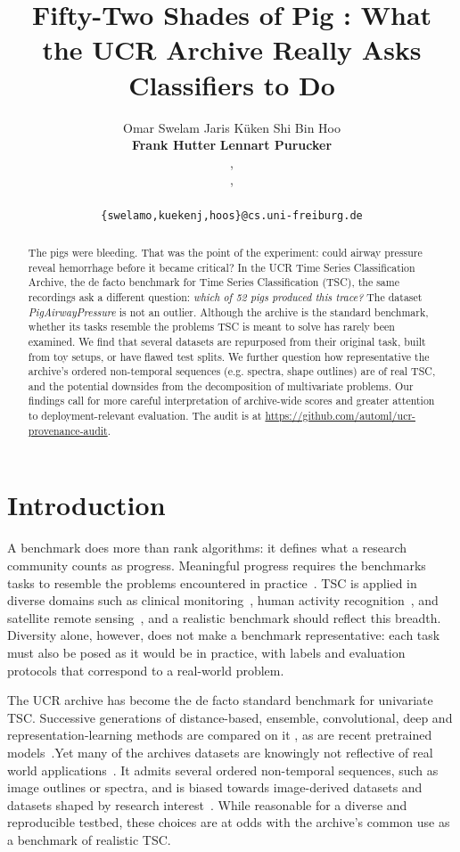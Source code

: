 \documentclass{article}
\title{Fifty-Two Shades of Pig \pig: What the UCR Archive Really Asks Classifiers to Do}
\author{
Omar Swelam \ufrc\equal \quad Jaris Küken \ufrc\equal \quad Shi Bin Hoo \ufrc\equal\\ \textbf{Frank Hutter} \priorc\ellisc\ufr \quad \textbf{Lennart Purucker}\priorc\ufr \\ 
\ufrtext, \\ \priortext, \ellistext \\
\equaltext \\
\texttt{\{swelamo,kuekenj,hoos\}@cs.uni-freiburg.de}
}
\begin{document}
\maketitle

\begin{abstract}
The pigs were bleeding. That was the point of the experiment: could airway pressure reveal hemorrhage before it became critical? In the UCR Time Series Classification Archive, the de facto benchmark for Time Series Classification (TSC), the same recordings ask a different question: \emph{which of 52 pigs produced this trace?} The dataset \emph{PigAirwayPressure} is not an outlier. Although the archive is the standard benchmark, whether its tasks resemble the problems TSC is meant to solve has rarely been examined. We find that several datasets are repurposed from their original task, built from toy setups, or have flawed test splits. We further question how representative the archive's ordered non-temporal sequences (e.g. spectra, shape outlines) are of real TSC, and the potential downsides from the decomposition of multivariate problems. Our findings call for more careful interpretation of archive-wide scores and greater attention to deployment-relevant evaluation. The audit is at \url{https://github.com/automl/ucr-provenance-audit}.

\end{abstract}

\section{Introduction}
A benchmark does more than rank algorithms: it defines what a research community counts as progress. Meaningful progress requires the benchmarks tasks to resemble the problems encountered in practice~\citep{raji2021everything, koch2021reduced}. TSC is applied in diverse domains such as clinical monitoring~\citep{clifford2017af}, human activity recognition~\citep{anguita2013har}, and satellite remote sensing~\citep{pelletier2019tempcnn}, and a realistic benchmark should reflect this breadth. Diversity alone, however, does not make a benchmark representative: each task must also be posed as it would be in practice, with labels and evaluation protocols that correspond to a real-world problem.

The UCR archive has become the de facto standard benchmark for univariate TSC. %
Successive generations of distance-based, ensemble, convolutional, deep and representation-learning methods are compared on it \citep{dempster2020rocket,middlehurst2021hc2,yue2022ts2vec,middlehurst2024redux}, as are recent pretrained models~\citep{goswami2024moment,feofanov2025mantis,kueken2026timee}.Yet many of the archives datasets are knowingly not reflective of real world applications~\citep{dau2019ucr}. %
It admits several ordered non-temporal sequences, such as image outlines or spectra, and is biased towards image-derived datasets and datasets shaped by research interest~\citep{dau2019ucr}. While reasonable for a diverse and reproducible testbed, these choices are at odds with the archive's common use as a benchmark of realistic TSC.
\end{document}
